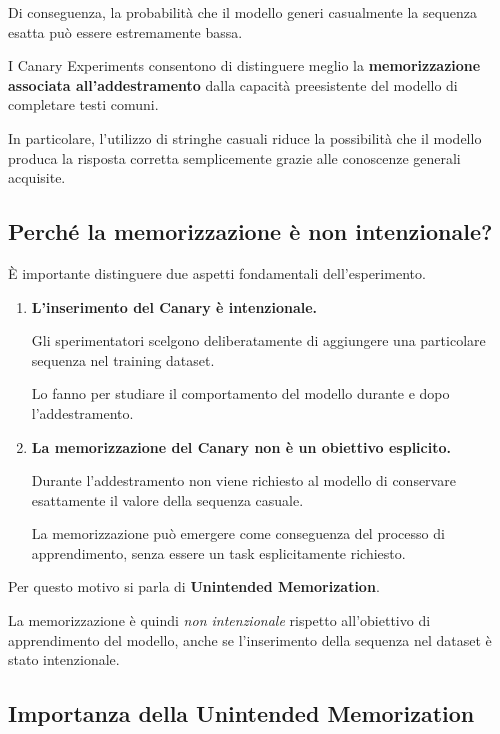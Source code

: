 Di conseguenza, la probabilità che il modello
generi casualmente la sequenza esatta può
essere estremamente bassa.

\begin{observation}
    I Canary Experiments consentono di distinguere
    meglio la \textbf{memorizzazione associata
    all'addestramento} dalla capacità preesistente
    del modello di completare testi comuni.

    In particolare, l'utilizzo di stringhe casuali
    riduce la possibilità che il modello produca
    la risposta corretta semplicemente grazie
    alle conoscenze generali acquisite.
\end{observation}

\subsection{Perché la memorizzazione è non intenzionale?}

È importante distinguere due aspetti
fondamentali dell'esperimento.

\begin{enumerate}
    \item \textbf{L'inserimento del Canary è intenzionale.}

    Gli sperimentatori scelgono deliberatamente
    di aggiungere una particolare sequenza
    nel training dataset.

    Lo fanno per studiare il comportamento
    del modello durante e dopo l'addestramento.

    \item \textbf{La memorizzazione del Canary
    non è un obiettivo esplicito.}

    Durante l'addestramento non viene richiesto
    al modello di conservare esattamente
    il valore della sequenza casuale.

    La memorizzazione può emergere come
    conseguenza del processo di apprendimento,
    senza essere un task esplicitamente richiesto.
\end{enumerate}

Per questo motivo si parla di
\textbf{Unintended Memorization}.

La memorizzazione è quindi \emph{non intenzionale}
rispetto all'obiettivo di apprendimento del modello,
anche se l'inserimento della sequenza nel dataset
è stato intenzionale.

\subsection{Importanza della Unintended Memorization}

